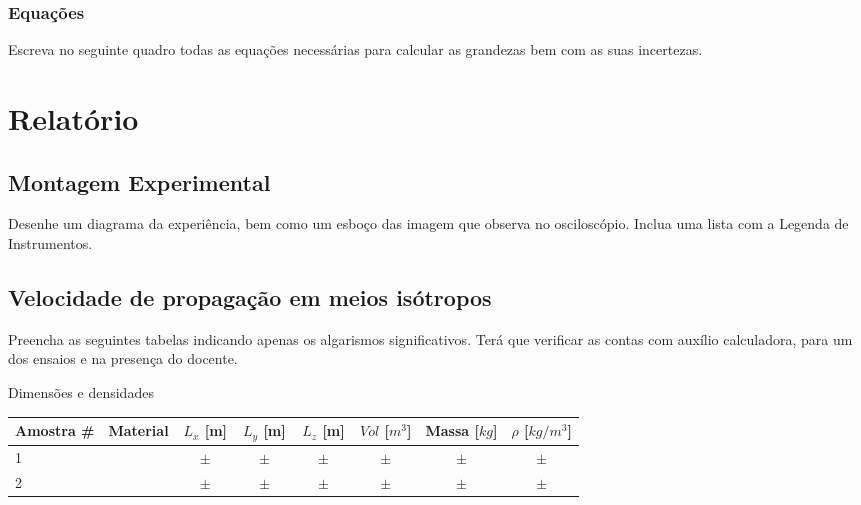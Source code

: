 \documentclass[a4paper,12pt]{article}  %
\begin{document}
\subsubsection{\sf Equações }
Escreva no seguinte quadro todas as equações necessárias para calcular as grandezas bem com as suas incertezas.
\begin{center}
\framebox[15cm]{\rule{0pt}{6.5cm}}
\end{center}


\section{\sf Relatório}
\subsection{\sf Montagem Experimental}
Desenhe um diagrama da experiência, bem como um esboço das imagem que observa no osciloscópio. Inclua uma lista com a Legenda de Instrumentos.

\begin{center}
\framebox[18cm]{\rule{0pt}{6.5cm}}
\end{center}

\subsection{\sf Velocidade de propagação em meios isótropos}%
Preencha as seguintes tabelas indicando  apenas os algarismos significativos. 
Terá que verificar as contas com auxílio calculadora, para um dos ensaios e na presença do docente.



Dimensões e densidades
\begin{center}
	\begin{tabular}{|l|c|c|c|c|c|c|c|}
	\hline
	 Amostra \# & Material  &  $L_x$ [m]  &   $L_y$ [m]  &  $L_z$ [m]  & $Vol$ [$m^3$]  & Massa [$kg$] & $\rho$ [$kg/m^3$] \\
	\hline \hline
	  1   &   & $ \quad \pm \quad $ &  $ \quad \pm \quad $ & $ \quad \pm \quad $ & $ \quad \pm \quad $ & $ \quad \pm \quad $ & $ \quad \pm \quad $ \\ \hline
	  2   &   & $ \quad \pm \quad $ &  $ \quad \pm \quad $ & $ \quad \pm \quad $ & $ \quad \pm \quad $ & $ \quad \pm \quad $ & $ \quad \pm \quad $ \\ \hline
				\end{tabular}
\end{center}
\end{document}

